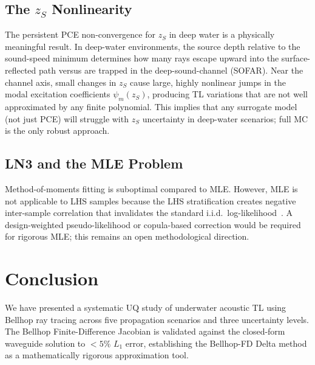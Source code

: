 \documentclass[journal,10pt,twoside]{IEEEtran}
\begin{document}
\subsection{The $z_S$ Nonlinearity}

The persistent PCE non-convergence for $z_S$ in deep water is a physically
meaningful result.
In deep-water environments, the source depth relative to the sound-speed
minimum determines how many rays escape upward into the surface-reflected
path versus are trapped in the deep-sound-channel (SOFAR).
Near the channel axis, small changes in $z_S$ cause large, highly nonlinear
jumps in the modal excitation coefficients $\psi_m(z_S)$, producing TL
variations that are not well approximated by any finite polynomial.
This implies that any surrogate model (not just PCE) will struggle with $z_S$
uncertainty in deep-water scenarios; full MC is the only robust approach.

\subsection{LN3 and the MLE Problem}

Method-of-moments fitting is suboptimal compared to MLE.
However, MLE is not applicable to LHS samples because the LHS stratification
creates negative inter-sample correlation that invalidates the standard
i.i.d.\ log-likelihood~\cite{iman2008}.
A design-weighted pseudo-likelihood or copula-based correction would be required
for rigorous MLE; this remains an open methodological direction.

\section{Conclusion}
\label{sec:conclusion}

We have presented a systematic UQ study of underwater acoustic TL using
Bellhop ray tracing across five propagation scenarios and three uncertainty
levels.
The Bellhop Finite-Difference Jacobian is validated against the closed-form
waveguide solution to $<5\%$ $L_1$ error, establishing the Bellhop-FD
Delta method as a mathematically rigorous approximation tool.
\end{document}
